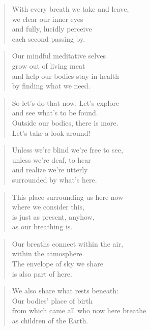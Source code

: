 \documentclass[14pt,a4paper]{article}
\begin{document}
\begin{verse}
With every breath we take and leave,\\
we clear our inner eyes\\
and fully, lucidly perceive\\
each second passing by.
\end{verse}

\begin{verse}
Our mindful meditative selves\\
grow out of living meat\\
and help our bodies stay in health\\
by finding what we need.
\end{verse}

\begin{verse}
So let’s do that now. Let’s explore\\
and see what’s to be found.\\
Outside our bodies, there is more.\\
Let’s take a look around!
\end{verse}

\begin{verse}
Unless we’re blind we’re free to see,\\
unless we’re deaf, to hear\\
and realize we’re utterly\\
surrounded by what’s here.
\end{verse}

\begin{verse}
This place surrounding us here now\\
where we consider this,\\
is just as present, anyhow,\\
as our breathing is.
\end{verse}

\begin{verse}
Our breaths connect within the air,\\
within the atmosphere.\\
The envelope of sky we share\\
is also part of here.
\end{verse}

\begin{verse}
We also share what rests beneath:\\
Our bodies’ place of birth\\
from which came all who now here breathe\\
as children of the Earth.
\end{verse}
\end{document}
